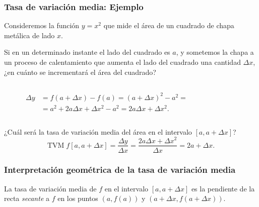 \begin{frame}
\frametitle{Tasa de variación media: Ejemplo}
Consideremos la función $y=x^2$ que mide el área de un cuadrado de chapa metálica de lado $x$.

Si en un determinado instante el lado del cuadrado es $a$, y sometemos la chapa a un proceso de calentamiento que aumenta el lado del cuadrado una cantidad $\Delta x$, ¿en cuánto se incrementará el área del cuadrado?
\begin{columns}
\begin{column}{0.3\textwidth}
\begin{align*}
\Delta y &= f(a+\Delta x)-f(a)=(a+\Delta x)^2-a^2=\\
&= a^2+2a\Delta x+\Delta x^2-a^2=2a\Delta x+\Delta x^2.
\end{align*}
\end{column}
\begin{column}{0.3\textwidth}
\begin{center}
\scalebox{1}{}
\end{center}
\end{column}
\end{columns}
¿Cuál será la tasa de variación media del área en el intervalo $[a,a+\Delta x]$?
\[
\textrm{TVM}\;f[a,a+\Delta x]=\frac{\Delta y}{\Delta x}=\frac{2a\Delta x+\Delta x^2}{\Delta x}=2a+\Delta x. 
\]
\end{frame}


\begin{frame}
\frametitle{Interpretación geométrica de la tasa de variación media}
La tasa de variación media de $f$ en el intervalo $[a,a+\Delta x]$ es la pendiente de la recta \emph{secante} a $f$ en los puntos $(a,f(a))$ y $(a+\Delta x,f(a+\Delta x))$.
\begin{center}
\scalebox{1}{}
\end{center}
\end{frame}


